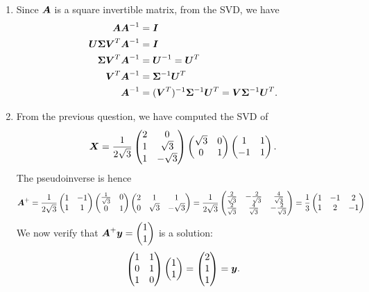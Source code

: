 \documentclass{report}
\newcommand{\Sg}{\mathbf{\Sigma}}
\begin{document}
	\begin{enumerate}
		\item Since $\boldsymbol{A}$ is a square invertible matrix, from the SVD, we have
		\begin{align*}
			\bmA\bmA^{-1}&=\bmI\\
			\bmU\Sg\bmV^{T}\bmA^{-1}&=\bmI\\
			\Sg\bmV^{T}\bmA^{-1}&=\bmU^{-1}=\bmU^{T}\\
			\bmV^{T}\bmA^{-1}&=\Sg^{-1}\bmU^{T}\\
			\bmA^{-1}&=(\bmV^{T})^{-1}\Sg^{-1}\bmU^{T}=\bmV\Sg^{-1}\bmU^{T}.
		\end{align*}
		\item From the previous question, we have computed the SVD of
		$$\boldsymbol{X}=\frac{1}{2\sqrt{3}}\begin{pmatrix}
			2 & 0 \\ 1 & \sqrt{3} \\ 1 & -\sqrt{3}
		\end{pmatrix}\begin{pmatrix}
			\sqrt{3} & 0 \\ 0 & 1
		\end{pmatrix}\begin{pmatrix}
			1 & 1 \\ -1 & 1
		\end{pmatrix}.$$
		The pseudoinverse is hence
		$$\boldsymbol{A}^+=\frac{1}{2\sqrt{3}}\begin{pmatrix}
			1 & -1 \\ 1 & 1
		\end{pmatrix}\begin{pmatrix}
		\frac{1}{\sqrt{3}} & 0 \\ 0 & 1
		\end{pmatrix}\begin{pmatrix}
		2 & 1 & 1 \\ 0 & \sqrt{3} & -\sqrt{3}
		\end{pmatrix}=\frac{1}{2\sqrt{3}}\begin{pmatrix}
		\frac{2}{\sqrt{3}} & -\frac{2}{\sqrt{3}} & \frac{4}{\sqrt{3}} \\
		\frac{2}{\sqrt{3}} & \frac{4}{\sqrt{3}} & -\frac{2}{\sqrt{3}} \\
		\end{pmatrix}=\frac{1}{3}\begin{pmatrix}
		1 & -1 & 2 \\ 1 & 2 & -1
		\end{pmatrix}$$
		We now verify that $\boldsymbol{A}^{+}\boldsymbol{y}=\begin{pmatrix}
			1 \\ 1
		\end{pmatrix}$ is a solution:
		$$\begin{pmatrix}
			1 & 1 \\ 0 & 1 \\ 1 & 0
		\end{pmatrix}\begin{pmatrix}
		1 \\ 1
		\end{pmatrix}=\begin{pmatrix}
		2 \\ 1 \\ 1 
		\end{pmatrix}=\boldsymbol{y}.$$
	\end{enumerate}
\end{document}
